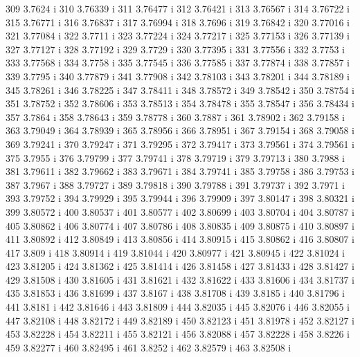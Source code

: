  309  3.7624  i
 310  3.76339  i
 311  3.76477  i
 312  3.76421  i
 313  3.76567  i
 314  3.76722  i
 315  3.76771  i
 316  3.76837  i
 317  3.76994  i
 318  3.7696  i
 319  3.76842  i
 320  3.77016  i
 321  3.77084  i
 322  3.7711  i
 323  3.77224  i
 324  3.77217  i
 325  3.77153  i
 326  3.77139  i
 327  3.77127  i
 328  3.77192  i
 329  3.7729  i
 330  3.77395  i
 331  3.77556  i
 332  3.7753  i
 333  3.77568  i
 334  3.7758  i
 335  3.77545  i
 336  3.77585  i
 337  3.77874  i
 338  3.77857  i
 339  3.7795  i
 340  3.77879  i
 341  3.77908  i
 342  3.78103  i
 343  3.78201  i
 344  3.78189  i
 345  3.78261  i
 346  3.78225  i
 347  3.78411  i
 348  3.78572  i
 349  3.78542  i
 350  3.78754  i
 351  3.78752  i
 352  3.78606  i
 353  3.78513  i
 354  3.78478  i
 355  3.78547  i
 356  3.78434  i
 357  3.7864  i
 358  3.78643  i
 359  3.78778  i
 360  3.7887  i
 361  3.78902  i
 362  3.79158  i
 363  3.79049  i
 364  3.78939  i
 365  3.78956  i
 366  3.78951  i
 367  3.79154  i
 368  3.79058  i
 369  3.79241  i
 370  3.79247  i
 371  3.79295  i
 372  3.79417  i
 373  3.79561  i
 374  3.79561  i
 375  3.7955  i
 376  3.79799  i
 377  3.79741  i
 378  3.79719  i
 379  3.79713  i
 380  3.7988  i
 381  3.79611  i
 382  3.79662  i
 383  3.79671  i
 384  3.79741  i
 385  3.79758  i
 386  3.79753  i
 387  3.7967  i
 388  3.79727  i
 389  3.79818  i
 390  3.79788  i
 391  3.79737  i
 392  3.7971  i
 393  3.79752  i
 394  3.79929  i
 395  3.79944  i
 396  3.79909  i
 397  3.80147  i
 398  3.80321  i
 399  3.80572  i
 400  3.80537  i
 401  3.80577  i
 402  3.80699  i
 403  3.80704  i
 404  3.80787  i
 405  3.80862  i
 406  3.80774  i
 407  3.80786  i
 408  3.80835  i
 409  3.80875  i
 410  3.80897  i
 411  3.80892  i
 412  3.80849  i
 413  3.80856  i
 414  3.80915  i
 415  3.80862  i
 416  3.80807  i
 417  3.809  i
 418  3.80914  i
 419  3.81044  i
 420  3.80977  i
 421  3.80945  i
 422  3.81024  i
 423  3.81205  i
 424  3.81362  i
 425  3.81414  i
 426  3.81458  i
 427  3.81433  i
 428  3.81427  i
 429  3.81508  i
 430  3.81605  i
 431  3.81621  i
 432  3.81622  i
 433  3.81606  i
 434  3.81737  i
 435  3.81853  i
 436  3.81699  i
 437  3.8167  i
 438  3.81708  i
 439  3.8185  i
 440  3.81796  i
 441  3.8181  i
 442  3.81646  i
 443  3.81809  i
 444  3.82035  i
 445  3.82076  i
 446  3.82055  i
 447  3.82108  i
 448  3.82172  i
 449  3.82189  i
 450  3.82123  i
 451  3.81978  i
 452  3.82127  i
 453  3.82228  i
 454  3.82211  i
 455  3.82121  i
 456  3.82088  i
 457  3.82228  i
 458  3.8226  i
 459  3.82277  i
 460  3.82495  i
 461  3.8252  i
 462  3.82579  i
 463  3.82508  i
